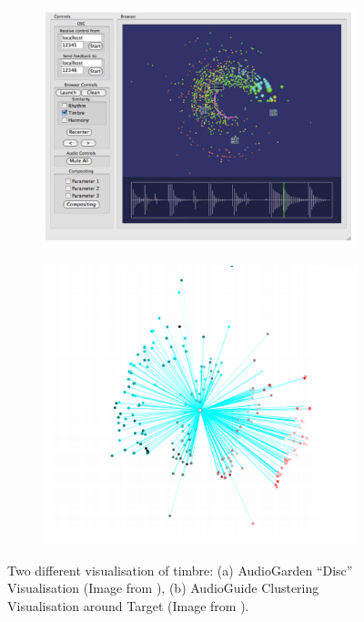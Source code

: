 \begin{figure}
\centering
\begin{subfigure}[b]{0.9\textwidth}
   \includegraphics[width=1\linewidth]{ch04_sota/figures/audiogarden.png}
   \caption{}
   \label{fig:Ng1} 
\end{subfigure}

\begin{subfigure}[b]{0.9\textwidth}
   \includegraphics[width=1\linewidth]{ch04_sota/figures/audioguide.png}
   \caption{}
   \label{fig:audioguide}
\end{subfigure}

\caption[AudioGarden and AudioGuide Interfaces]{Two different visualisation of timbre: (a) AudioGarden ``Disc'' Visualisation (Image from \cite{Frisson2010}), (b) AudioGuide Clustering Visualisation around Target (Image from \cite{Schwarz2012}).}
\end{figure}

